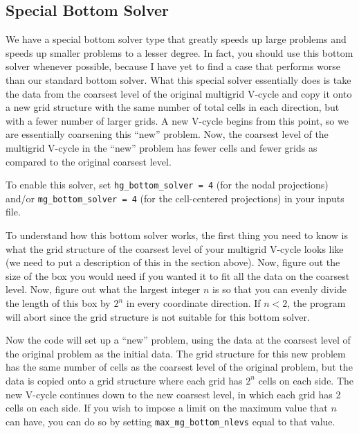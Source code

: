 
\subsection{Special Bottom Solver}
We have a special bottom solver type that greatly speeds up large problems
and speeds up smaller problems to a lesser degree.
In fact, you should use this bottom solver whenever possible, because I
have yet to find a case that performs worse than our standard bottom solver.
What this special solver essentially does is take the data from the coarsest 
level of the original multigrid V-cycle and copy it onto a new grid structure 
with the same number of total cells in each direction, but with a fewer number of larger 
grids.  A new V-cycle begins from this point, 
so we are essentially coarsening this ``new'' problem.
Now, the coarsest level of the multigrid V-cycle in the ``new'' problem has 
fewer cells and fewer grids as compared to the original coarsest level.

To enable this solver, set {\tt hg\_bottom\_solver = 4} (for the nodal
projections) and/or {\tt mg\_bottom\_solver = 4} (for the cell-centered
projections) in your inputs file.

To understand how this bottom solver works, the first thing you need to know
is what the grid structure of the coarsest level of your multigrid V-cycle
looks like (we need to put a description of this in the section above).
Now, figure out the size of the box you would need if you
wanted it to fit all the data on the coarsest level.  Now, figure out what
the largest integer $n$ is so that you can evenly divide the length of this box
by $2^n$ in every coordinate direction.  If $n < 2$, the program will abort
since the grid structure is not suitable for this bottom solver.

Now the code will set up a ``new'' problem, using the data at the coarsest level
of the original problem as the initial data.  The grid structure for this new
problem has the same number of cells as the coarsest level of the original problem,
but the data is copied onto a grid structure where each grid has $2^n$ cells
on each side.  The new V-cycle continues down to the new coarsest level, in
which each grid has 2 cells on each side.  If you wish to impose a limit on
the maximum value that $n$ can have, you can do so by setting 
{\tt max\_mg\_bottom\_nlevs} equal to that value.

